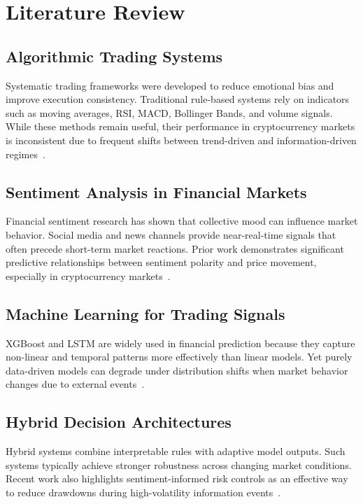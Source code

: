 \chapter{Literature Review}\label{ch2}

\section{Algorithmic Trading Systems}
Systematic trading frameworks were developed to reduce emotional bias and improve execution consistency. Traditional rule-based systems rely on indicators such as moving averages, RSI, MACD, Bollinger Bands, and volume signals. While these methods remain useful, their performance in cryptocurrency markets is inconsistent due to frequent shifts between trend-driven and information-driven regimes~\cite{chan2013,elder2014,corbet2019,hudson2021}.

\section{Sentiment Analysis in Financial Markets}
Financial sentiment research has shown that collective mood can influence market behavior. Social media and news channels provide near-real-time signals that often precede short-term market reactions. Prior work demonstrates significant predictive relationships between sentiment polarity and price movement, especially in cryptocurrency markets~\cite{bollen2011,kraaijeveld2020,bing2021,abraham2018}.

\section{Machine Learning for Trading Signals}
XGBoost and LSTM are widely used in financial prediction because they capture non-linear and temporal patterns more effectively than linear models. Yet purely data-driven models can degrade under distribution shifts when market behavior changes due to external events~\cite{chen2016,fischer2018,nelson2017,hochreiter1997}.

\section{Hybrid Decision Architectures}
Hybrid systems combine interpretable rules with adaptive model outputs. Such systems typically achieve stronger robustness across changing market conditions. Recent work also highlights sentiment-informed risk controls as an effective way to reduce drawdowns during high-volatility information events~\cite{aldridge2017,li2022}.

